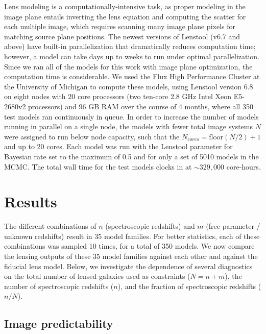 Lens modeling is a computationally-intensive task, as proper modeling in the image plane entails inverting the lens equation and computing the scatter for each multiple image, which requires scanning many image plane pixels for matching source plane positions. The newest versions of Lenstool (v6.7 and above) have built-in parallelization that dramatically reduces computation time; however, a model can take days up to weeks to run under optimal parallelization. Since we ran all of the models for this work with image plane optimization, the computation time is considerable. We used the Flux High Performance Cluster at the University of Michigan to compute these models, using Lenstool version 6.8 on eight nodes with 20 core processors (two ten-core 2.8 GHz Intel Xeon E5-2680v2 processors) and 96 GB RAM over the course of 4 months, where all 350 test models ran continuously in queue. In order to increase the number of models running in parallel on a single node, the models with fewer total image systems $N$ were assigned to run below node capacity, such that the $N_{cores}=\mathrm{floor}(N/2)+1$ and up to 20 cores. Each model was run with the Lenstool parameter for Bayesian rate set to the maximum of 0.5 and for only a set of 5010 models in the MCMC. The total wall time for the test models clocks in at $\sim329,000$ core-hours.

\section{Results}
\label{chap3:sec:results}

The different combinations of $n$ (spectroscopic redshifts) and $m$ (free parameter / unknown redshifts) result in 35 model families. For better statistics, each of these combinations was sampled 10 times, for a total of 350 models. We now compare the lensing outputs of these 35 model families against each other and against the fiducial lens model.  Below, we investigate the dependence of several diagnostics on the total number of lensed galaxies used as constraints ($N=n+m$), the number of spectroscopic redshifts ($n$), and the fraction of spectroscopic redshifts ($n/N$). 

\subsection{Image predictability}
\label{chap3:subsec:rms}

